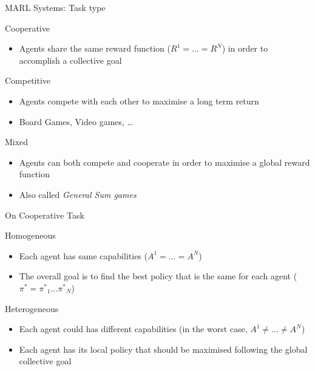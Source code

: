 \documentclass[presentation]{beamer}\mode<presentation>{\usetheme{AMSBolognaFC}}
\begin{document}
\begin{frame}{MARL Systems: Task type}
	\begin{alertblock}{Cooperative}
		\begin{itemize}
			\item Agents share the same reward function ($R^1 = \dots = R^N$) in order to accomplish a collective goal
		\end{itemize}
	\end{alertblock}
	\begin{exampleblock}{Competitive}
		\begin{itemize}
			\item Agents compete with each other to maximise a long term return
			\item Board Games, Video games, \dots
		\end{itemize}
	\end{exampleblock}
	\begin{exampleblock}{Mixed}
		\begin{itemize}
			\item Agents can both compete and cooperate in order to maximise a global reward function
			\item Also called \textit{General Sum games}
		\end{itemize}
	\end{exampleblock}
\end{frame}
\begin{frame}{On Cooperative Task}
	\begin{exampleblock}{Homogeneous}
		\begin{itemize}
			\item Each agent has same capabilities ($A^1 = \dots = A^N$)
			\item The overall goal is to find the best policy that is the same for each agent ($\pi^* = {\pi^{*}}_1 \dots {\pi^{*}}_N$)
		\end{itemize}
	\end{exampleblock}
	\begin{exampleblock}{Heterogeneous}
		\begin{itemize}
			\item Each agent could has different capabilities (in the worst case, $A^1 \neq \dots \neq A^N$)
			\item Each agent has its local policy that should be maximised following the global collective goal
		\end{itemize}
	\end{exampleblock}
\end{frame}
\end{document}
